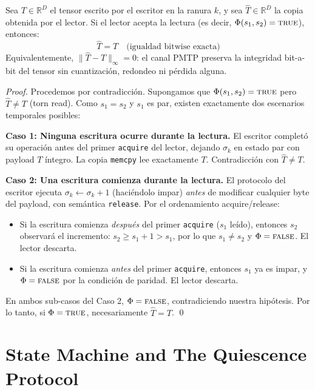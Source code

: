 \begin{theorem}

Sea $T \in \mathbb{R}^D$ el tensor escrito por el escritor en la ranura $k$, y sea 
$\hat{T} \in \mathbb{R}^D$ la copia obtenida por el lector. Si el lector acepta
la lectura (es decir, $\Phi(s_1, s_2) = \textsc{true}$), entonces:
\begin{equation}
\hat{T} = T \quad \text{(igualdad bitwise exacta)}
\end{equation}
Equivalentemente, $\| \hat{T} - T \|_\infty = 0$: el canal PMTP preserva la
integridad bit-a-bit del tensor sin cuantización, redondeo ni pérdida alguna.
\end{theorem}

\begin{proof}
Procedemos por contradicción. Supongamos que $\Phi(s_1, s_2) = \textsc{true}$
pero $\hat{T} \neq T$ (torn read). Como $s_1 = s_2$ y $s_1$ es par, existen
exactamente dos escenarios temporales posibles:

\textbf{Caso 1: Ninguna escritura ocurre durante la lectura.} 
El escritor completó su operación antes del primer \texttt{acquire} del lector,
dejando $\sigma_k$ en estado par con payload $T$ íntegro. La copia 
\texttt{memcpy} lee exactamente $T$. Contradicción con $\hat{T} \neq T$.

\textbf{Caso 2: Una escritura comienza durante la lectura.}
El protocolo del escritor ejecuta $\sigma_k \leftarrow \sigma_k + 1$ (haciéndolo
impar) \emph{antes} de modificar cualquier byte del payload, con semántica
\texttt{release}. Por el ordenamiento acquire/release:
\begin{itemize}
    \item Si la escritura comienza \emph{después} del primer \texttt{acquire}
    ($s_1$ leído), entonces $s_2$ observará el incremento:
    $s_2 \geq s_1 + 1 > s_1$, por lo que $s_1 \neq s_2$ y 
    $\Phi = \textsc{false}$. El lector descarta.
    \item Si la escritura comienza \emph{antes} del primer \texttt{acquire},
    entonces $s_1$ ya es impar, y $\Phi = \textsc{false}$ por la condición
    de paridad. El lector descarta.
\end{itemize}

En ambos sub-casos del Caso 2, $\Phi = \textsc{false}$, contradiciendo nuestra 
hipótesis. Por lo tanto, si $\Phi = \textsc{true}$, necesariamente 
$\hat{T} = T$. \qed
\end{proof}

\section{State Machine and The Quiescence Protocol}

